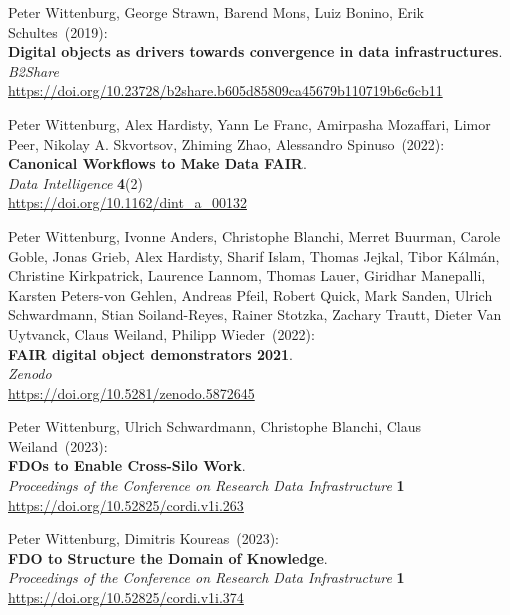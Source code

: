 \begin{thebibliography}{9}
Peter Wittenburg, George Strawn, Barend Mons, Luiz Bonino, Erik
Schultes~(2019): \\
\textbf{Digital objects as drivers towards convergence in data
infrastructures}. \\
\emph{B2Share}\\
\url{https://doi.org/10.23728/b2share.b605d85809ca45679b110719b6c6cb11}

Peter Wittenburg, Alex Hardisty, Yann Le Franc, Amirpasha Mozaffari, Limor Peer, Nikolay A. Skvortsov, Zhiming Zhao, Alessandro Spinuso~(2022): \\
\textbf{Canonical Workflows to Make Data FAIR}.\\
\emph{Data Intelligence} \textbf{4}(2)\\
\url{https://doi.org/10.1162/dint_a_00132}

Peter Wittenburg, Ivonne Anders, Christophe Blanchi, Merret Buurman,
Carole Goble, Jonas Grieb, Alex Hardisty, Sharif Islam, Thomas Jejkal,
Tibor Kálmán, Christine Kirkpatrick, Laurence Lannom, Thomas Lauer,
Giridhar Manepalli, Karsten Peters-von Gehlen, Andreas Pfeil, Robert
Quick, Mark Sanden, Ulrich Schwardmann, Stian Soiland-Reyes, Rainer
Stotzka, Zachary Trautt, Dieter Van Uytvanck, Claus Weiland, Philipp
Wieder~(2022): \\
\textbf{FAIR digital object demonstrators 2021}.\\
\emph{Zenodo}\\
\url{https://doi.org/10.5281/zenodo.5872645}

Peter Wittenburg, Ulrich Schwardmann, Christophe Blanchi, Claus Weiland~(2023): \\
\textbf{FDOs to Enable Cross-Silo Work}.\\
\emph{Proceedings of the Conference on Research Data Infrastructure}
\textbf{1} \\
\url{https://doi.org/10.52825/cordi.v1i.263}

Peter Wittenburg, Dimitris Koureas~(2023): \\
\textbf{FDO to Structure the Domain of Knowledge}.\\
\emph{Proceedings of the Conference on Research Data Infrastructure}
\textbf{1} \\
\url{https://doi.org/10.52825/cordi.v1i.374}


\end{thebibliography}
